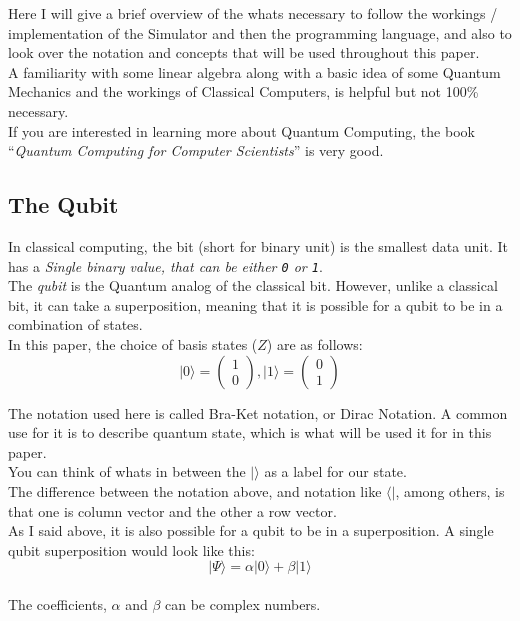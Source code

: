 \documentclass[../main.tex]{subfiles}
\begin{document}
Here I will give a brief overview of the whats necessary to follow
the workings / implementation of the Simulator and then the programming language, and also to look over the notation and concepts that will be used throughout this paper.\\
A familiarity with some linear algebra 
along with a basic idea of some Quantum Mechanics and the workings of Classical Computers, is helpful
but not 100\% necessary. \\
If you are interested in learning more about Quantum Computing, the book
``\emph{Quantum Computing for Computer Scientists}'' \cite{quantumcomputerscience} is very good.

\subsection{The Qubit}

In classical computing, the bit (short for binary unit) is the smallest
data unit. It has a \emph{Single binary value, that can be either
\texttt{0} or \texttt{1}}.\\
The \emph{qubit} is the Quantum analog of the classical bit.
However, unlike a classical bit, it can take a superposition, meaning
that it is possible for a qubit to be in a combination of
states.\\
In this paper, the choice of basis states (\(Z\)) are as follows:
\begin{equation}
	\lvert0\rangle =\left( \begin{matrix} 1\\ 0 \end{matrix} \right), \lvert1\rangle =\left( \begin{matrix} 0\\ 1\end{matrix} \right)
\end{equation}

The notation used here is called Bra-Ket notation, or Dirac Notation. A
common use for it is to describe quantum state, which is what will be
used it for in this paper.\\
You can think of whats in between the \(\lvert\rangle\) as a label for our
state.\\
The difference between the notation above, and notation like
\(\langle\lvert\), among others, is that one is column vector and the other a
row vector.\\
As I said above, it is also possible for a qubit to be in a
superposition. A single qubit superposition would look like this:\\
\[
\left\lvert \Psi \rangle =\alpha\lvert0\rangle +\beta\right\lvert 1\rangle\]\\
The coefficients, \(\alpha\) and \(\beta\) can be complex numbers.
\end{document}
